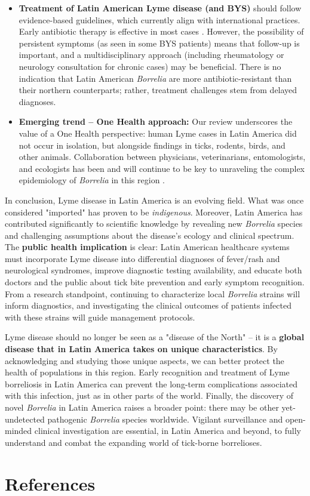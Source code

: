 \documentclass[11pt,letterpaper]{article}
\begin{document}
\begin{itemize}
    \item \textbf{Treatment of Latin American Lyme disease (and BYS)} should follow evidence-based guidelines, which currently align with international practices. Early antibiotic therapy is effective in most cases \citep{Yoshinari2022ar}. However, the possibility of persistent symptoms (as seen in some BYS patients) means that follow-up is important, and a multidisciplinary approach (including rheumatology or neurology consultation for chronic cases) may be beneficial. There is no indication that Latin American \textit{Borrelia} are more antibiotic-resistant than their northern counterparts; rather, treatment challenges stem from delayed diagnoses.

    \item \textbf{Emerging trend – One Health approach:} Our review underscores the value of a One Health perspective: human Lyme cases in Latin America did not occur in isolation, but alongside findings in ticks, rodents, birds, and other animals. Collaboration between physicians, veterinarians, entomologists, and ecologists has been and will continue to be key to unraveling the complex epidemiology of \textit{Borrelia} in this region \citep{Colunga-Salas2022g, Colunga-Salas2022h}.
\end{itemize}

In conclusion, Lyme disease in Latin America is an evolving field. What was once considered "imported" has proven to be \textit{indigenous}. Moreover, Latin America has contributed significantly to scientific knowledge by revealing new \textit{Borrelia} species and challenging assumptions about the disease's ecology and clinical spectrum. The \textbf{public health implication} is clear: Latin American healthcare systems must incorporate Lyme disease into differential diagnoses of fever/rash and neurological syndromes, improve diagnostic testing availability, and educate both doctors and the public about tick bite prevention and early symptom recognition. From a research standpoint, continuing to characterize local \textit{Borrelia} strains will inform diagnostics, and investigating the clinical outcomes of patients infected with these strains will guide management protocols.

Lyme disease should no longer be seen as a "disease of the North" – it is a \textbf{global disease that in Latin America takes on unique characteristics}. By acknowledging and studying those unique aspects, we can better protect the health of populations in this region. Early recognition and treatment of Lyme borreliosis in Latin America can prevent the long-term complications associated with this infection, just as in other parts of the world. Finally, the discovery of novel \textit{Borrelia} in Latin America raises a broader point: there may be other yet-undetected pathogenic \textit{Borrelia} species worldwide. Vigilant surveillance and open-minded clinical investigation are essential, in Latin America and beyond, to fully understand and combat the expanding world of tick-borne borrelioses.

\newpage
\singlespacing
\section*{References}


\end{document}

